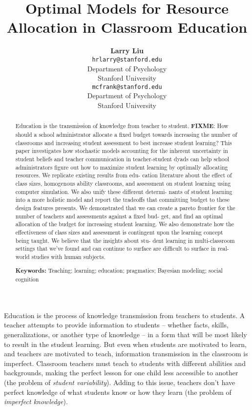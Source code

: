 \documentclass[10pt, letterpaper]{article}
\title{Optimal Models for Resource Allocation in Classroom Education}
\author{{\large \bf Larry Liu} \\ \texttt{hrlarry@stanford.edu} \\ Department of Psychology \\ Stanford University \And {\large \bf Michael C. Frank} \\ \texttt{mcfrank@stanford.edu} \\ Department of Psychology \\ Stanford University}
\begin{document}
\maketitle

\begin{abstract}
Education is the transmission of knowledge from teacher to student.
\textbf{FIXME}: How should a school administrator allocate a fixed
budget towards increasing the number of classrooms and increasing
student assessment to best increase student learning? This paper
investigates how stochastic models accounting for the inherent
uncertainty in student beliefs and teacher communication in
teacher-student dyads can help school administrators figure out how to
maximize student learning by optimally allocating resources. We
replicate existing results from edu- cation literature about the effect
of class sizes, homogenous ability classrooms, and assessment on student
learning using computer simulation. We also unify these different
determi- nants of student learning into a more holistic model and report
the tradeoffs that committing budget to these design features presents.
We demonstrated that we can create a pareto frontier for the number of
teachers and assessments against a fixed bud- get, and find an optimal
allocation of the budget for increasing student learning. We also
demonstrate how the effectiveness of class sizes and assessment is
contingent upon the learning concept being taught. We believe that the
insights about stu- dent learning in multi-classroom settings that we've
found and can continue to surface are difficult to surface in real-world
studies with human subjects.

\textbf{Keywords:}
Teaching; learning; education; pragmatics; Bayesian modeling; social
cognition
\end{abstract}

Education is the process of knowledge transmission from teachers to
students. A teacher attempts to provide information to students --
whether facts, skills, generalizations, or another type of knowledge --
in a form that will be most likely to result in the student learning.
But even when students are motivated to learn, and teachers are
motivated to teach, information transmission in the classroom is
imperfect. Classroom teachers must teach to students with different
abilities and backgrounds, making the perfect lesson for one child less
accessible to another (the problem of \emph{student variability}).
Adding to this issue, teachers don't have perfect knowledge of what
students know or how they learn (the problem of \emph{imperfect
knowledge}).
\end{document}
